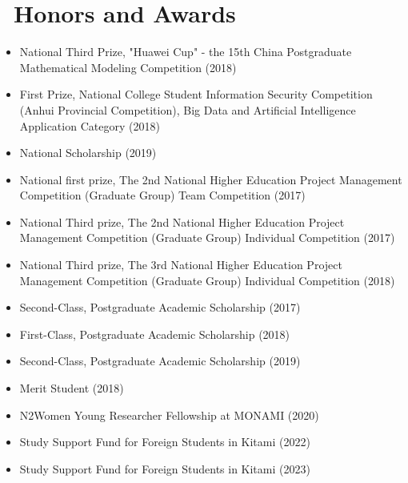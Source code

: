 \documentclass{resume}
\begin{document}
\section{\faHeartO\ Honors and Awards}
\begin{itemize}
  \item National Third Prize, "Huawei Cup" - the 15th China Postgraduate Mathematical Modeling Competition (2018)
  \item First Prize, National College Student Information Security Competition (Anhui Provincial Competition), Big Data and Artificial Intelligence Application Category (2018)
  \item National Scholarship (2019)
  \item National first prize, The 2nd National Higher Education Project Management Competition (Graduate Group) Team Competition (2017)
  \item National Third prize, The 2nd National Higher Education Project Management Competition (Graduate Group) Individual Competition (2017)
  \item National Third prize, The 3rd National Higher Education Project Management Competition (Graduate Group) Individual Competition (2018)
  \item Second-Class, Postgraduate Academic Scholarship (2017)
  \item First-Class, Postgraduate Academic Scholarship (2018)
  \item Second-Class, Postgraduate Academic Scholarship (2019)
  \item Merit Student (2018)
\end{itemize}

\begin{itemize}
  \item N2Women Young Researcher Fellowship at MONAMI (2020)
  \item Study Support Fund for Foreign Students in Kitami (2022)
  \item Study Support Fund for Foreign Students in Kitami (2023)
\end{itemize}
%
%
\end{document}
